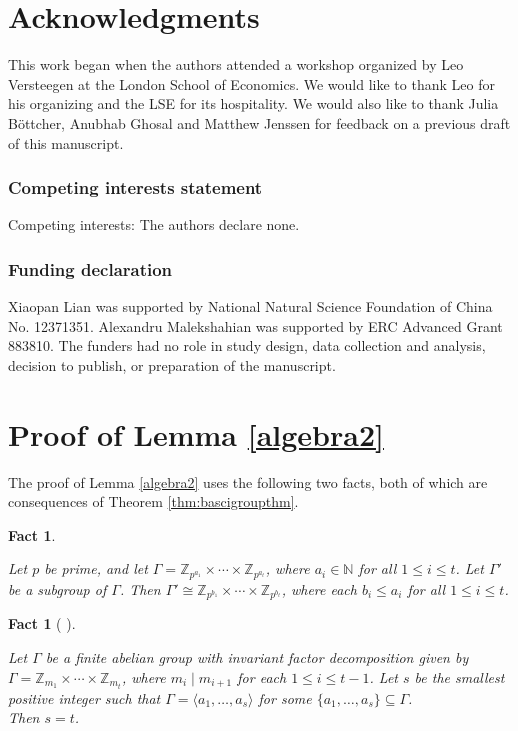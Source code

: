 \documentclass{article}
\newcommand\NN{{\mathbb N}}
\newcommand\ZZ{{\mathbb Z}}
\newcommand{\se}{\subseteq}
\newtheorem{fact}[theorem]{Fact}
\theoremstyle{definition}
\begin{document}
\section*{Acknowledgments}
This work began when the authors attended a workshop organized by Leo Versteegen at the London School of Economics. We would like to thank Leo for his organizing and the LSE for its hospitality. We would also like to thank Julia Böttcher, Anubhab Ghosal and Matthew Jenssen for feedback on a previous draft of this manuscript.

\subsubsection*{Competing interests statement}
Competing interests: The authors declare none.

\subsubsection*{Funding declaration}

Xiaopan Lian was supported by National Natural Science Foundation of China No. 12371351. Alexandru Malekshahian was supported by ERC Advanced Grant 883810. The funders had no role in study design, data collection and analysis, decision to publish, or preparation of the manuscript.





\appendix



\section{Proof of Lemma \ref{algebra2}}\label{sec.pfalg}

The proof of Lemma \ref{algebra2} uses the following two facts, both of which are consequences of Theorem \ref{thm:bascigroupthm}.
\begin{fact}\label{fact:alg1}

Let $p$ be prime, and let $\Gamma = \ZZ_{p^{a_1}} \times \cdots  \times \ZZ_{p^{a_t}}$, where $a_i \in \NN$ for all $1 \le i \le t$. Let $\Gamma'$ be a subgroup of $\Gamma$. Then $\Gamma' \cong \ZZ_{p^{b_1}} \times \cdots  \times \ZZ_{p^{b_t}}$, where each $b_i \le a_i$ for all $1 \le i \le t$. 
\end{fact}

\begin{fact}[\!\! {\cite[Theorem 3.1]{min_gen_set}}]\label{fact:alg2} 

 Let $\Gamma$ be a finite abelian group with invariant factor decomposition given by $\Gamma = \mathbb{Z}_{m_1} \times\cdots\times \mathbb{Z}_{m_t}$,
    where $m_i \mid m_{i+1}$ for each $1 \le i \le t-1$. 
    Let $s$ be the smallest positive integer such that $\Gamma = \langle a_1,\ldots,a_s\rangle$ for some $\{a_1,\ldots,a_s\} \se \Gamma$. \\
    Then $s = t$. 
\end{fact}
\end{document}
